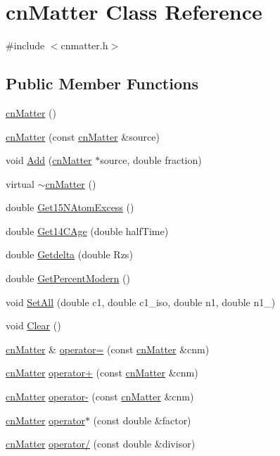 \hypertarget{classcn_matter}{
\section{cnMatter Class Reference}
\label{classcn_matter}
}


{\ttfamily \#include $<$cnmatter.h$>$}\subsection*{Public Member Functions}
\begin{DoxyCompactItemize}
\item 
\hyperlink{classcn_matter_a8a07b87102cd364c23e5b8e48ade6433}{cnMatter} ()
\item 
\hyperlink{classcn_matter_aae88d7e5f5b03a570cbd616af5f67c49}{cnMatter} (const \hyperlink{classcn_matter}{cnMatter} \&source)
\item 
void \hyperlink{classcn_matter_aad24583a2b209ed86fbc261bbed83d4e}{Add} (\hyperlink{classcn_matter}{cnMatter} $\ast$source, double fraction)
\item 
virtual \hyperlink{classcn_matter_a03f21518aa68037d4481d87907c8b2e2}{$\sim$cnMatter} ()
\item 
double \hyperlink{classcn_matter_ace56d55eee753b16e722a8506baa4b23}{Get15NAtomExcess} ()
\item 
double \hyperlink{classcn_matter_a9c5f67a2d3dde92db86a0fc791f0592c}{Get14CAge} (double halfTime)
\item 
double \hyperlink{classcn_matter_ab6bf079d174644a74cc013717cea0912}{Getdelta} (double Rzs)
\item 
double \hyperlink{classcn_matter_ae01f1fa8c17a4bd64de34cfd6a180dd6}{GetPercentModern} ()
\item 
void \hyperlink{classcn_matter_aaf59c0cd3ef2526a5a5e3e536ae3de46}{SetAll} (double c1, double c1\_\-iso, double n1, double n1\_)
\item 
void \hyperlink{classcn_matter_a45d9021d50f76e167388bf5de2e406ed}{Clear} ()
\item 
\hyperlink{classcn_matter}{cnMatter} \& \hyperlink{classcn_matter_ad3c60b93c3aba076b8f81de724198f31}{operator=} (const \hyperlink{classcn_matter}{cnMatter} \&cnm)
\item 
\hyperlink{classcn_matter}{cnMatter} \hyperlink{classcn_matter_afaf7d3a8759467c407f3399097f449de}{operator+} (const \hyperlink{classcn_matter}{cnMatter} \&cnm)
\item 
\hyperlink{classcn_matter}{cnMatter} \hyperlink{classcn_matter_ae0417a0adb039f71f75d810d80cce2b4}{operator-\/} (const \hyperlink{classcn_matter}{cnMatter} \&cnm)
\item 
\hyperlink{classcn_matter}{cnMatter} \hyperlink{classcn_matter_a97a9f46efac3c82b0d33c1e74e23640c}{operator$\ast$} (const double \&factor)
\item 
\hyperlink{classcn_matter}{cnMatter} \hyperlink{classcn_matter_a251b67b6dcfc44453c2806890d38930f}{operator/} (const double \&divisor)
\end{DoxyCompactItemize}
